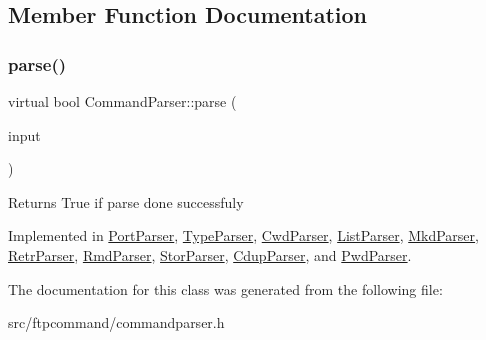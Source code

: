 \subsection{Member Function Documentation}
\mbox{\label{classCommandParser_a5ed0855947a9b4500329f29b8123f2ea}} 
\subsubsection{\texorpdfstring{parse()}{parse()}}
{\footnotesize\ttfamily virtual bool Command\+Parser\+::parse (\begin{DoxyParamCaption}\item[{const Q\+String \&}]{input }\end{DoxyParamCaption})\hspace{0.3cm}{\ttfamily [pure virtual]}}

\begin{DoxyReturn}{Returns}
True if parse done successfuly 
\end{DoxyReturn}


Implemented in \hyperlink{classPortParser_a7dbb8e4f695ed023c502a4c1f689d061}{Port\+Parser}, \hyperlink{classTypeParser_afc5fc9fbf55f8ecec885312dd396a353}{Type\+Parser}, \hyperlink{classCwdParser_a4037186e2a7229bc7499f138a559d47b}{Cwd\+Parser}, \hyperlink{classListParser_ad26061c7101e88d72fc86ccec6cc13a6}{List\+Parser}, \hyperlink{classMkdParser_ad886e57eeff70f08b2e057879fb0d9df}{Mkd\+Parser}, \hyperlink{classRetrParser_ace04fa9e7c638452de2d40dacc5a0471}{Retr\+Parser}, \hyperlink{classRmdParser_a19bc9f3a082934c2e8eb9eb8d8aee5f3}{Rmd\+Parser}, \hyperlink{classStorParser_a3b268c187eaf7135971fb553e9d10cf3}{Stor\+Parser}, \hyperlink{classCdupParser_abfd60eab9d76c34867434b8a36289701}{Cdup\+Parser}, and \hyperlink{classPwdParser_a2eb9149ae412e0d3a1b4b8f70f037224}{Pwd\+Parser}.



The documentation for this class was generated from the following file\+:\begin{DoxyCompactItemize}
\item 
src/ftpcommand/commandparser.\+h\end{DoxyCompactItemize}
